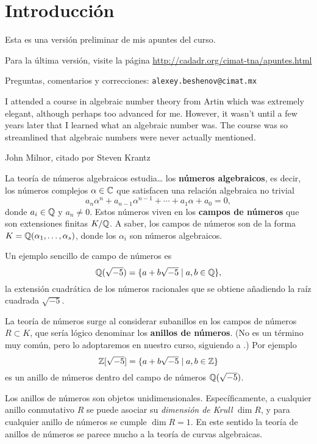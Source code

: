 \chapter*{Introducción}

\begin{framed}
  Esta es una versión preliminar de mis apuntes del curso.

  Para la última versión, visite la página
  \url{http://cadadr.org/cimat-tna/apuntes.html}

  Preguntas, comentarios y correcciones:
  \texttt{alexey.beshenov@cimat.mx}
\end{framed}

\epigraph{I attended a course in algebraic number theory from Artin which was
  extremely elegant, although perhaps too advanced for me. However, it wasn't
  until a few years later that I learned what an algebraic number was. The
  course was so streamlined that algebraic numbers were never actually
  mentioned.}
  {John Milnor, citado por Steven Krantz}

La teoría de números algebraicos estudia\dots{} los
\textbf{números algebraicos}, es decir, los números complejos $\alpha \in \mathbb{C}$
que satisfacen una relación algebraica no trivial
$$a_n \alpha^n + a_{n-1} \alpha^{n-1} + \cdots + a_1 \alpha + a_0 = 0,$$
donde $a_i \in \mathbb{Q}$ y $a_n \ne 0$. Estos números viven en
los \textbf{campos de números} que son extensiones finitas $K/\mathbb{Q}$.
A saber, los campos de números son de la forma $K = \mathbb{Q}
(\alpha_1,\ldots,\alpha_s)$, donde los $\alpha_i$ son números algebraicos.

Un ejemplo sencillo de campo de números es
$$\mathbb{Q} (\sqrt{-5}) = \{ a + b\sqrt{-5} \mid a,b \in \mathbb{Q} \},$$
la extensión cuadrática de los números racionales que se obtiene añadiendo la
raíz cuadrada $\sqrt{-5}$.

La teoría de números surge al considerar subanillos en los campos de números
$R \subset K$, que sería lógico denominar los \textbf{anillos de números}.
(No es un término muy común, pero lo adoptaremos en nuestro curso, siguiendo
a \cite{Stevenhagen-NR}.) Por ejemplo
$$\mathbb{Z} [\sqrt{-5}] = \{ a + b\sqrt{-5} \mid a,b \in \mathbb{Z} \}$$
es un anillo de números dentro del campo de números $\mathbb{Q} (\sqrt{-5})$.

Los anillos de números son objetos unidimensionales. Específicamente, a
cualquier anillo conmutativo $R$ se puede asociar su \emph{dimensión de Krull}
$\dim R$, y para cualquier anillo de números se cumple $\dim R = 1$. En este
sentido la teoría de anillos de números se parece mucho a la teoría de curvas
algebraicas.

